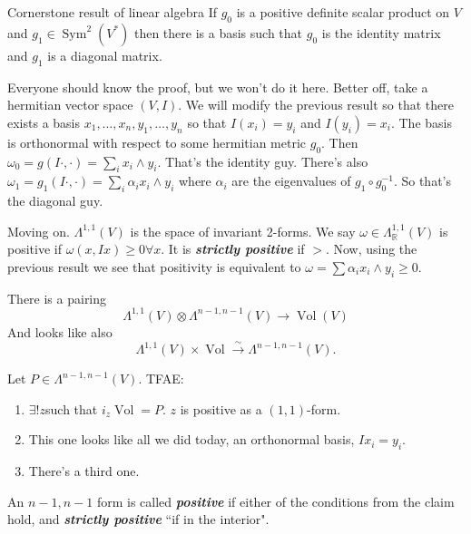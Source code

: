 \begin{thing5}{Cornerstone result of linear algebra}\leavevmode
If \(g_0\) is a positive definite scalar product on \(V\) and \(g_1 \in \operatorname{Sym}^2(V^*)\) then there is a basis such that \(g_0\) is the identity matrix and \(g_1\) is a diagonal matrix.
\end{thing5}

Everyone should know the proof, but we won't do it here. Better off, take a hermitian vector space \((V,I)\). We will modify the previous result so that there exists a basis  \(x_1,\ldots,x_n,y_1,\ldots,y_n\) so that \(I(x_i)=y_i\) and \(I(y_i)=x_i\). The basis is orthonormal with respect to some hermitian metric \(g_0\). Then \(\omega_0=g(I \cdot ,\cdot )=\sum_i x_i \wedge y_i\). That's the identity guy. There's also \(\omega_1=g_1(I\cdot ,\cdot )=\sum_i\alpha_i x_i \wedge y_i\) where \(\alpha_i\) are the eigenvalues of \(g_1 \circ g_0^{-1}\). So that's the diagonal guy.

Moving on. \(\Lambda^{1,1}(V)\) is the space of invariant 2-forms. We say \(\omega \in \Lambda^{ 1,1}_{\mathbb{R}}(V)\) is positive if \(\omega(x,Ix)\geq 0\forall x\). It is \textit{\textbf{strictly positive}} if \(>\). Now, using the previous result we see that positivity is equivalent to \(\omega= \sum \alpha_i x_i \wedge y_i \geq 0\).

There is a pairing
\[\Lambda^{1,1}(V)\otimes \Lambda^{n-1,n-1}(V)\to \operatorname{Vol}(V)\]
And looks like also
\[\Lambda^{1,1}(V)\times \operatorname{Vol} \xrightarrow{\sim}\Lambda^{n-1,n-1}(V).\]

\begin{claim}\leavevmode
Let \(P \in \Lambda^{n-1,n-1}(V)\). TFAE:
\begin{enumerate}[label=(\roman*)]
\item \(\exists ! z \)such that \(i_z \operatorname{Vol}=P\). \(z\) is positive as a \((1,1)\)-form.
\item This one looks like all we did today, an orthonormal basis, \(Ix_i=y_i\).
\item There's a third one.
\end{enumerate}
\end{claim}

\begin{defn}\leavevmode
An \(n-1,n-1\) form is called \textit{\textbf{positive}} if either of the conditions from the claim hold, and \textit{\textbf{strictly positive}} ``if in the interior".
\end{defn}

